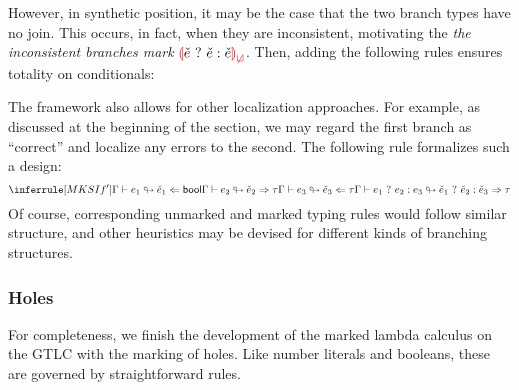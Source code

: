 However, in synthetic position, it may be the case that the two branch types have no join. This
occurs, in fact, when they are inconsistent, motivating the \emph{the inconsistent branches mark}
$\ECInconBr{\ECMV}{\ECMV}{\ECMV}$. Then, adding the following rules ensures totality on
conditionals:
%
\begin{mathpar}

\end{mathpar}

The framework also allows for other localization approaches. For example, as discussed at the
beginning of the section, we may regard the first branch as ``correct'' and localize any errors to
the second. The following rule formalizes such a design:
\[%
  \judgment{
    \ctxAnaFixedInto{\ctx}{\EMV_1}{\ECMV_1}{\TBool} \\
    \ctxSynFixedInto{\ctx}{\EMV_2}{\ECMV_2}{\TMV} \\
    \ctxAnaFixedInto{\ctx}{\EMV_3}{\ECMV_3}{\TMV}
  }{
    \ctxSynFixedInto{\ctx}{\EIf{\EMV_1}{\EMV_2}{\EMV_3}}{\ECIf{\ECMV_1}{\ECMV_2}{\ECMV_3}}{\TMV}
  }{MKSIf'}
\]%
Of course, corresponding unmarked and marked typing rules would follow similar structure, and other
heuristics may be devised for different kinds of branching structures.

\subsubsection{Holes}
For completeness, we finish the development of the marked lambda calculus on the GTLC with the
marking of holes. Like number literals and booleans, these are governed by straightforward rules.
%
\begin{mathpar}

  
\end{mathpar}

